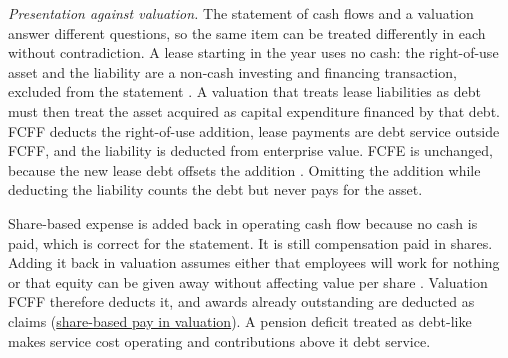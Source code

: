 \begin{qfmethod}
\emph{Presentation against valuation.} The statement of cash flows and a valuation answer different questions, so the same item can be treated differently in each without contradiction. A lease starting in the year uses no cash: the right-of-use asset and the liability are a non-cash investing and financing transaction, excluded from the statement \citep[IAS~7 paras.~43--44]{eu-2023-1803-ias7}. A valuation that treats lease liabilities as debt must then treat the asset acquired as capital expenditure financed by that debt. FCFF deducts the right-of-use addition, lease payments are debt service outside FCFF, and the liability is deducted from enterprise value. FCFE is unchanged, because the new lease debt offsets the addition \citep[pp.~25--27, 30--32]{leases-debt-value-2009}. Omitting the addition while deducting the liability counts the debt but never pays for the asset.

Share-based expense is added back in operating cash flow because no cash is paid, which is correct for the statement. It is still compensation paid in shares. Adding it back in valuation assumes either that employees will work for nothing or that equity can be given away without affecting value per share \citep[slide~14]{free-cash-flow-primer-2022}. Valuation FCFF therefore deducts it, and awards already outstanding are deducted as claims (\hyperref[meth:share-based-compensation-modelling]{share-based pay in valuation}). A pension deficit treated as debt-like makes service cost operating and contributions above it debt service.


\end{qfmethod}
